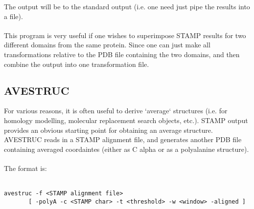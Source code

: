 The output will be to the standard output (i.e. one need just
pipe the results into a file).  \\
\\
This program is very useful if one wishes to superimpose STAMP results
for two different domains from the same protein.  Since one can just
make all transformations relative to the PDB file containing the two domains,
and then combine the output into one transformation file.


\subsection{AVESTRUC}

For various reasons, it is often useful to derive `average`
structures (i.e. for homology modelling, molecular replacement
search objects, etc.).  STAMP output provides an obvious starting
point for obtaining an average structure.  AVESTRUC reads in a
STAMP alignment file, and generates another PDB file containing
averaged coordaintes (either as C alpha or as a polyalanine 
structure).\\
\\
The format is:\\
\\
\begin{scriptsize}\begin{verbatim}
avestruc -f <STAMP alignment file> 
       [ -polyA -c <STAMP char> -t <threshold> -w <window> -aligned ]
\end{verbatim} \end{scriptsize}

